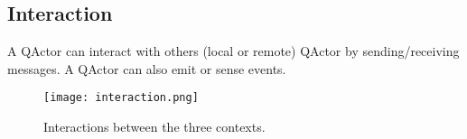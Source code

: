 \subsection{Interaction}
A QActor can interact with others (local or remote) QActor by sending/receiving messages. A QActor can also emit or sense events.
\begin{figure}[h]
	\centering
	\texttt{[image: interaction.png]}
	\caption{Interactions between the three contexts.}
\end{figure}